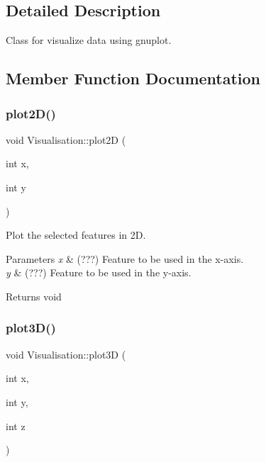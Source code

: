 \subsection{Detailed Description}
Class for visualize data using gnuplot. 

\subsection{Member Function Documentation}
\mbox{\label{class_visualisation_a7569c77520391e6adf7e285410f4b358}} 
\subsubsection{\texorpdfstring{plot2\+D()}{plot2D()}}
{\footnotesize\ttfamily void Visualisation\+::plot2D (\begin{DoxyParamCaption}\item[{int}]{x,  }\item[{int}]{y }\end{DoxyParamCaption})}



Plot the selected features in 2D. 


\begin{DoxyParams}{Parameters}
{\em x} & (???) Feature to be used in the x-\/axis. \\
\hline
{\em y} & (???) Feature to be used in the y-\/axis. \\
\hline
\end{DoxyParams}
\begin{DoxyReturn}{Returns}
void 
\end{DoxyReturn}
\mbox{\label{class_visualisation_a39cf83c146a4c92a32782bfdf6168594}} 
\subsubsection{\texorpdfstring{plot3\+D()}{plot3D()}}
{\footnotesize\ttfamily void Visualisation\+::plot3D (\begin{DoxyParamCaption}\item[{int}]{x,  }\item[{int}]{y,  }\item[{int}]{z }\end{DoxyParamCaption})}



